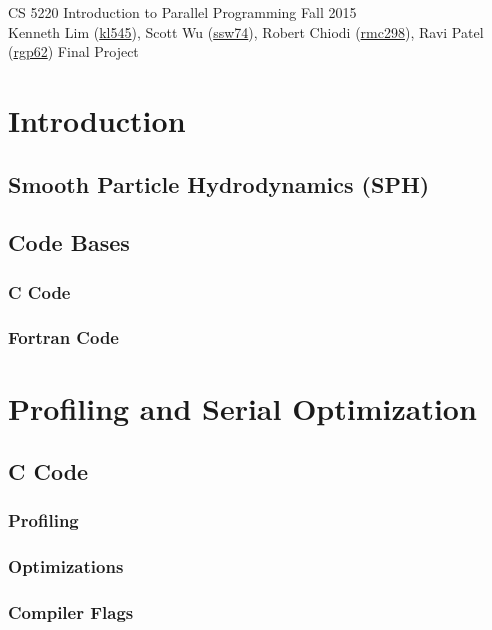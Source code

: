 \documentclass{scrartcl}
\begin{document}
  \begin{framed}
  CS 5220 Introduction to Parallel Programming \hfill Fall 2015 \\
  Kenneth Lim (\href{mailto:kl545@cornell.edu}{kl545}), Scott Wu (\href{mailto:ssw74@cornell.edu}{ssw74}), Robert Chiodi (\href{mailto:rmc298@cornell.edu}{rmc298}), Ravi Patel (\href{mailto:rgp62@cornell.edu}{rgp62})  \hfill Final Project \hspace{-3ex}
  \end{framed}
  
  
  \section{Introduction}
  
  \subsection{Smooth Particle Hydrodynamics (SPH)}
  
  \subsection{Code Bases}
  \subsubsection{C Code}
  
  
  \subsubsection{Fortran Code}
    
    
    
  \section{Profiling and Serial Optimization}  
  \subsection{C Code}

  \subsubsection{Profiling}
  
  \subsubsection{Optimizations}
  \subsubsection{Compiler Flags}
  
\end{document}
